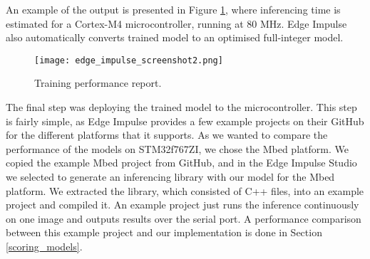 An example of the output is presented in Figure \ref{edge_impulse_screenshot2}, where inferencing time is estimated for a Cortex-M4 microcontroller, running at 80 \si{\mega\hertz}.
Edge Impulse also automatically converts trained model to an optimised full-integer model.

\begin{figure}[ht]
    \centering
    \texttt{[image: edge\_impulse\_screenshot2.png]} 
    \caption{ Training performance report.}
    \label{edge_impulse_screenshot2}
\end{figure}

The final step was deploying the trained model to the microcontroller.
This step is fairly simple, as Edge Impulse provides a few example projects on their GitHub for the different platforms that it supports.
As we wanted to compare the performance of the models on STM32f767ZI, we chose the Mbed platform.
We copied the example Mbed project from GitHub, and in the Edge Impulse Studio we selected to generate an inferencing library with our model for the Mbed platform.
We extracted the library, which consisted of C++ files, into an example project and compiled it.
An example project just runs the inference continuously on one image and outputs results over the serial port.
A performance comparison between this example project and our implementation is done in Section \ref{scoring_models}.
